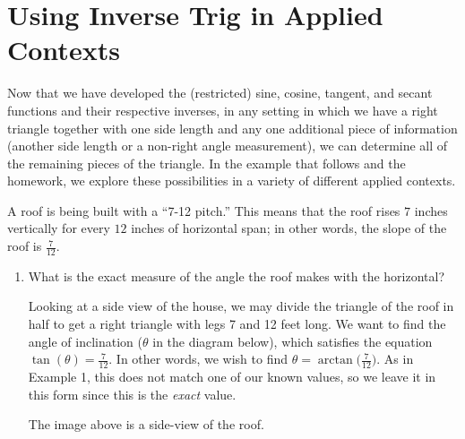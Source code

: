 \documentclass{ximera}
\begin{document}
\section{Using Inverse Trig in Applied Contexts}
%
Now that we have developed the (restricted) sine, cosine, tangent, and secant functions and their respective inverses, in any setting in which we have a right triangle together with one side length and any one additional piece of information (another side length or a non-right angle measurement), we can determine all of the remaining pieces of the triangle. In the example that follows and the homework, we explore these possibilities in a variety of different applied contexts.
%
\begin{example}%
A roof is being built with a ``7-12 pitch.'' This means that the roof rises $7$ inches vertically for every $12$ inches of horizontal span; in other words, the slope of the roof is $\frac{7}{12}$. 
%
\begin{enumerate}
\item What is the exact measure of the angle the roof makes with the horizontal? \\
\begin{explanation}
Looking at a side view of the house, we may divide the triangle of the roof in half to get a right triangle with legs 7 and 12 feet long. We want to find the angle of inclination ($\theta$ in the diagram below), which satisfies the equation $\tan(\theta) = \frac{7}{12}$. In other words, we wish to find $\theta = \arctan\!\Big(\frac{7}{12}\Big)$. As in Example 1, this does not match one of our known values, so we leave it in this form since this is the {\em exact} value.

\end{explanation}

\begin{image}%
		\end{image}
	The image above is a side-view of the roof.


\end{enumerate}
\end{example}
\end{document}
